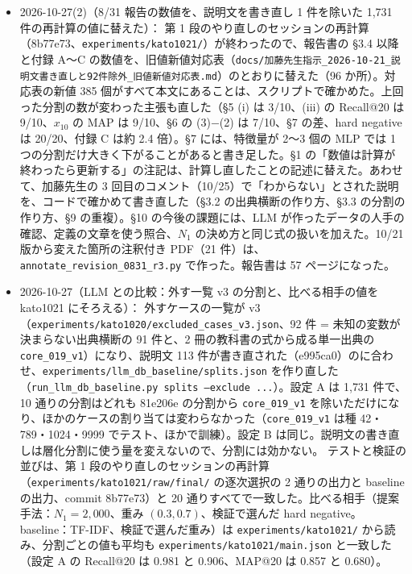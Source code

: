 \documentclass[11pt,a4paper]{jsarticle}
\begin{document}
\begin{itemize}[nosep]
    latexmk は exit 0、未定義の参照 0、本文 1〜25 ページ、全体 72 ページ。
  \item 2026-10-27(2)（8/31 報告の数値を、説明文を書き直し 1 件を除いた 1{,}731 件の再計算の値に替えた）：
    第 1 段のやり直しのセッションの再計算（8b77e73、\texttt{experiments/kato1021/}）が終わったので、報告書の \S 3.4 以降と付録 A〜C の数値を、旧値新値対応表（\texttt{docs/加藤先生指示\_2026-10-21\_説明文書き直しと92件除外\_旧値新値対応表.md}）のとおりに替えた（96 か所）。対応表の新値 385 個がすべて本文にあることは、スクリプトで確かめた。上回った分割の数が変わった主張も直した（\S 5 (i) は 3/10、(iii) の Recall@20 は 9/10、$x_{10}$ の MAP は 9/10、\S 6 の (3)$-$(2) は 7/10、\S 7 の差、hard negative は 20/20、付録 C は約 2.4 倍）。\S 7 には、特徴量が 2〜3 個の MLP では 1 つの分割だけ大きく下がることがあると書き足した。\S 1 の「数値は計算が終わったら更新する」の注記は、計算し直したことの記述に替えた。あわせて、加藤先生の 3 回目のコメント（10/25）で「わからない」とされた説明を、コードで確かめて書き直した（\S 3.2 の出典横断の作り方、\S 3.3 の分割の作り方、\S 9 の重複）。\S 10 の今後の課題には、LLM が作ったデータの人手の確認、定義の文章を使う照合、$N_1$ の決め方と同じ式の扱いを加えた。10/21 版から変えた箇所の注釈付き PDF（21 件）は、\texttt{annotate\_revision\_0831\_r3.py} で作った。報告書は 57 ページになった。
  \item 2026-10-27（LLM との比較：外す一覧 v3 の分割と、比べる相手の値を kato1021 にそろえる）：
    外すケースの一覧が v3（\texttt{experiments/kato1020/excluded\_cases\_v3.json}、92 件 = 未知の変数が決まらない出典横断の 91 件と、2 冊の教科書の式から成る単一出典の \texttt{core\_019\_v1}）になり、説明文 113 件が書き直された（e995ca0）のに合わせ、\texttt{experiments/llm\_db\_baseline/splits.json} を作り直した（\texttt{run\_llm\_db\_baseline.py splits --exclude ...}）。設定 A は 1{,}731 件で、10 通りの分割はどれも 81e206e の分割から \texttt{core\_019\_v1} を除いただけになり、ほかのケースの割り当ては変わらなかった（\texttt{core\_019\_v1} は種 42・789・1024・9999 でテスト、ほかで訓練）。設定 B は同じ。説明文の書き直しは層化分割に使う量を変えないので、分割には効かない。
    テストと検証の並びは、第 1 段のやり直しのセッションの再計算（\texttt{experiments/kato1021/raw/final/} の逐次選択の 2 通りの出力と baseline の出力、commit 8b77e73）と 20 通りすべてで一致した。比べる相手（提案手法：$N_1 = 2{,}000$、重み $(0.3, 0.7)$、検証で選んだ hard negative。baseline：TF-IDF、検証で選んだ重み）は \texttt{experiments/kato1021/} から読み、分割ごとの値も平均も \texttt{experiments/kato1021/main.json} と一致した（設定 A の Recall@20 は 0.981 と 0.906、MAP@20 は 0.857 と 0.680）。

\end{itemize}
\end{document}
